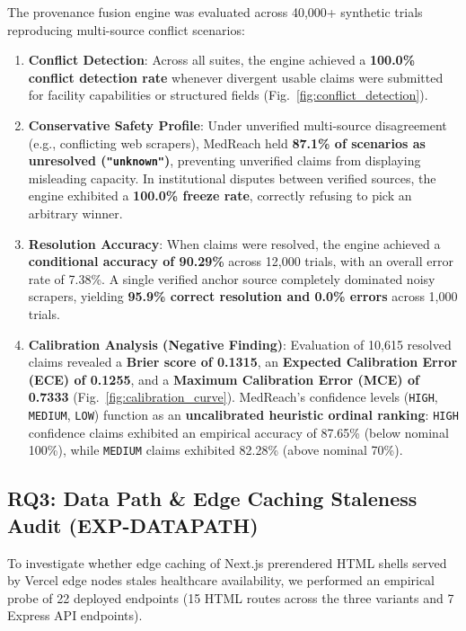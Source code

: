\documentclass[conference]{IEEEtran}
\begin{document}
The provenance fusion engine was evaluated across 40,000+ synthetic trials reproducing multi-source conflict scenarios:
\begin{enumerate}
    \item \textbf{Conflict Detection}: Across all suites, the engine achieved a \textbf{100.0\% conflict detection rate} whenever divergent usable claims were submitted for facility capabilities or structured fields (Fig.~\ref{fig:conflict_detection}).
    \item \textbf{Conservative Safety Profile}: Under unverified multi-source disagreement (e.g., conflicting web scrapers), MedReach held \textbf{87.1\% of scenarios as unresolved (\texttt{"unknown"})}, preventing unverified claims from displaying misleading capacity. In institutional disputes between verified sources, the engine exhibited a \textbf{100.0\% freeze rate}, correctly refusing to pick an arbitrary winner.
    \item \textbf{Resolution Accuracy}: When claims were resolved, the engine achieved a \textbf{conditional accuracy of 90.29\%} across 12,000 trials, with an overall error rate of 7.38\%. A single verified anchor source completely dominated noisy scrapers, yielding \textbf{95.9\% correct resolution and 0.0\% errors} across 1,000 trials.
    \item \textbf{Calibration Analysis (Negative Finding)}: Evaluation of 10,615 resolved claims revealed a \textbf{Brier score of 0.1315}, an \textbf{Expected Calibration Error (ECE) of 0.1255}, and a \textbf{Maximum Calibration Error (MCE) of 0.7333} (Fig.~\ref{fig:calibration_curve}). MedReach's confidence levels (\texttt{HIGH}, \texttt{MEDIUM}, \texttt{LOW}) function as an \textbf{uncalibrated heuristic ordinal ranking}: \texttt{HIGH} confidence claims exhibited an empirical accuracy of 87.65\% (below nominal 100\%), while \texttt{MEDIUM} claims exhibited 82.28\% (above nominal 70\%).
\end{enumerate}

\subsection{RQ3: Data Path \& Edge Caching Staleness Audit (EXP-DATAPATH)}
To investigate whether edge caching of Next.js prerendered HTML shells served by Vercel edge nodes stales healthcare availability, we performed an empirical probe of 22 deployed endpoints (15 HTML routes across the three variants and 7 Express API endpoints).
\end{document}

